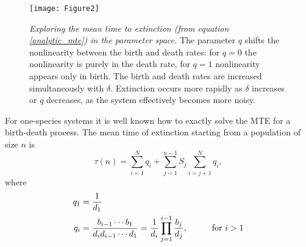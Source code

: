 \begin{figure}[h]
	\centering
	\texttt{[image: Figure2]}
	\caption{\emph{Exploring the mean time to extinction (from equation \ref{analytic_mte}) in the parameter space.} The parameter $q$ shifts the nonlinearity between the birth and death rates: for $q=0$ the nonlinearity is purely in the death rate, for $q=1$ nonlinearity appears only in birth. The birth and death rates are increased simultaneously with $\delta$. Extinction occurs more rapidly as $\delta$ increases or $q$ decreases, as the system effectively becomes more noisy. }
	 \label{mteCP}
\end{figure}

For one-species systems it is well known how to exactly solve the MTE for a birth-death process. 
The mean time of extinction starting from a population of size $n$ is \cite{Nisbet1982,Palamara2013}
\begin{equation}
\tau(n) = \sum_{i=1}^{N}q_i + \sum_{j=1}^{n-1} S_j\sum_{i=j+1}^{N}q_i,
\label{analytic_mte}
\end{equation}
where
\begin{align}
q_1 &= \frac{1}{d_1} \\
q_i &= \frac{b_{i-1}\cdots b_1}{d_i d_{i-1}\cdots d_1} = \frac{1}{d_i}\prod_{j=1}^{i-1}\frac{b_j}{d_j}, \hspace{1cm} \text{for }i > 1 \notag
\end{align}

